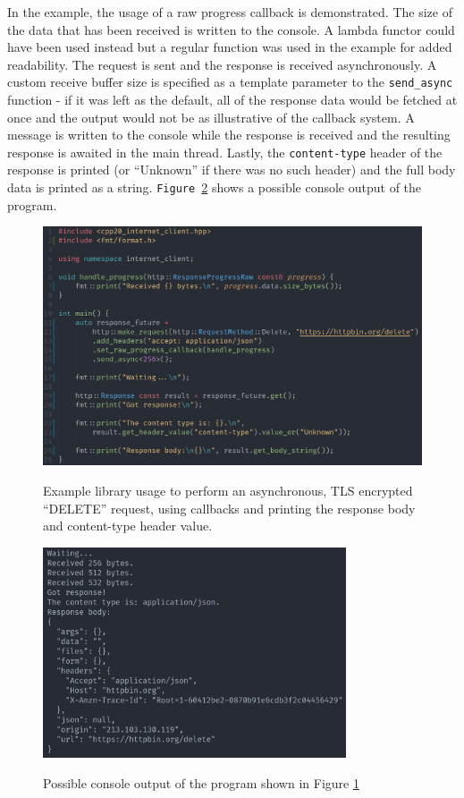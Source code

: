 \documentclass[12pt, a4paper]{article}
\begin{document}
In the example, the usage of a raw progress callback is demonstrated. The size of the data that has been received is written to the console. A lambda functor could have been used instead but a regular function was used in the example for added readability. The request is sent and the response is received asynchronously. A custom receive buffer size is specified as a template parameter to the \texttt{send\_async} function - if it was left as the default, all of the response data would be fetched at once and the output would not be as illustrative of the callback system. A message is written to the console while the response is received and the resulting response is awaited in the main thread. Lastly, the \texttt{content-type} header of the response is printed (or “Unknown” if there was no such header) and the full body data is printed as a string. \texttt{Figure \ref{fig:async_request_output}} shows a possible console output of the program.

\begin{figure}[hp]
	\centering
	\caption{Example library usage to perform an asynchronous, TLS encrypted “DELETE” request, using callbacks and printing the response body and content-type header value.}
	\includegraphics[width=\textwidth]{async_request_example}
	\label{fig:async_request_example}
\end{figure}

\begin{figure}[hp]
	\centering
	\caption{Possible console output of the program shown in Figure \ref{fig:async_request_example}}
	\includegraphics[width=0.8\textwidth]{async_request_output}
	\label{fig:async_request_output}
\end{figure}
\end{document}
